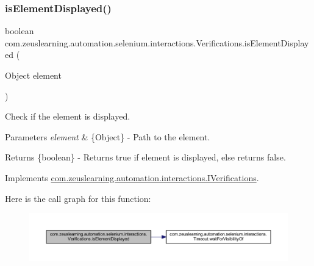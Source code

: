 \subsubsection{\texorpdfstring{is\+Element\+Displayed()}{isElementDisplayed()}\hspace{0.1cm}{\footnotesize\ttfamily [1/2]}}
{\footnotesize\ttfamily boolean com.\+zeuslearning.\+automation.\+selenium.\+interactions.\+Verifications.\+is\+Element\+Displayed (\begin{DoxyParamCaption}\item[{Object}]{element }\end{DoxyParamCaption})\hspace{0.3cm}{\ttfamily [inline]}}

Check if the element is displayed.


\begin{DoxyParams}{Parameters}
{\em element} & \{Object\} -\/ Path to the element. \\
\hline
\end{DoxyParams}
\begin{DoxyReturn}{Returns}
\{boolean\} -\/ Returns {\ttfamily true} if element is displayed, else returns {\ttfamily false}. 
\end{DoxyReturn}


Implements \hyperlink{interfacecom_1_1zeuslearning_1_1automation_1_1interactions_1_1IVerifications_a058cc25b997507a15fe6e76ba401d54d}{com.\+zeuslearning.\+automation.\+interactions.\+I\+Verifications}.

Here is the call graph for this function\+:
\nopagebreak
\begin{figure}[H]
\begin{center}
\leavevmode
\includegraphics[width=350pt]{d2/d6b/classcom_1_1zeuslearning_1_1automation_1_1selenium_1_1interactions_1_1Verifications_a848b9875c187f2c7f5bbf6b78f7db58f_cgraph}
\end{center}
\end{figure}
\hypertarget{classcom_1_1zeuslearning_1_1automation_1_1selenium_1_1interactions_1_1Verifications_a264caf7f6bbeaec8a7a416024ec4617b}{}\label{classcom_1_1zeuslearning_1_1automation_1_1selenium_1_1interactions_1_1Verifications_a264caf7f6bbeaec8a7a416024ec4617b} 
